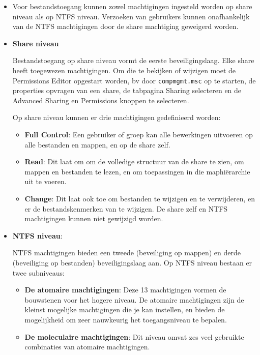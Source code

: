 \begin{enumerate}
{		}
		
		 { 
			\begin{itemize}
				\item Voor bestandstoegang kunnen zowel machtigingen ingesteld worden op share niveau als op NTFS niveau. Verzoeken van gebruikers kunnen onafhankelijk van de NTFS machtigingen door de share machtiging geweigerd worden. 
				\item \textbf{Share niveau}
				
				Bestandstoegang op share niveau vormt de eerste beveiligingslaag. Elke share heeft toegewezen machtigingen. Om die te bekijken of wijzigen moet de Permissions Editor opgestart worden, bv door \texttt{compmgmt.msc} op te starten, de properties opvragen van een share, de tabpagina Sharing selecteren en de Advanced Sharing en Permissions knoppen te selecteren.

				Op share niveau kunnen er drie machtigingen gedefinieerd worden:
				\begin{itemize}
					\item \textbf{Full Control}: Een gebruiker of groep kan alle bewerkingen uitvoeren op alle bestanden en mappen, en op de share zelf. 
					\item \textbf{Read}: Dit laat om om de volledige structuur van de share te zien, om mappen en bestanden te lezen, en om toepassingen in die maphiërarchie uit te voeren.
					\item \textbf{Change}: Dit laat ook toe om bestanden te wijzigen en te verwijderen, en er de bestandskenmerken van te wijzigen. De share zelf en NTFS machtigingen kunnen niet gewijzigd worden.
				\end{itemize}
				\item \textbf{NTFS niveau}:
				
				NTFS machtigingen bieden een tweede (beveiliging op mappen) en derde (beveiliging op bestanden) beveiligingslaag aan. Op NTFS niveau bestaan er twee subniveaus:
				\begin{itemize}
					\item \textbf{De atomaire machtigingen}: Deze 13 machtigingen vormen de bouwstenen voor het hogere niveau. De atomaire machtigingen zijn de kleinst mogelijke machtigingen die je kan instellen, en bieden de mogelijkheid om zeer nauwkeurig het toegangsniveau te bepalen. 
					\item \textbf{De moleculaire machtigingen}: Dit niveau omvat zes veel gebruikte combinaties van atomaire machtigingen. 
				\end{itemize}


\end{itemize}}
\end{enumerate}
